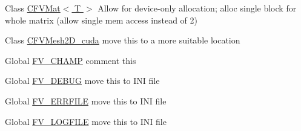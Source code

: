 \label{dd/da0/todo__todo000001}
\hypertarget{dd/da0/todo__todo000001}{}
 
\begin{DoxyDescription}
\item[Class \hyperlink{classFVL_1_1CFVMat}{CFVMat$<$ T $>$} ]Allow for device-\/only allocation; alloc single block for whole matrix (allow single mem access instead of 2) 
\end{DoxyDescription}

\label{dd/da0/todo__todo000002}
\hypertarget{dd/da0/todo__todo000002}{}
 
\begin{DoxyDescription}
\item[Class \hyperlink{structFVL_1_1CFVMesh2D__cuda}{CFVMesh2D\_\-cuda} ]move this to a more suitable location 
\end{DoxyDescription}

\label{dd/da0/todo__todo000006}
\hypertarget{dd/da0/todo__todo000006}{}
 
\begin{DoxyDescription}
\item[Global \hyperlink{FVMacros_8h_a8142e87b22064c193f2a21692cbc8e32}{FV\_\-CHAMP} ]comment this 
\end{DoxyDescription}

\label{dd/da0/todo__todo000011}
\hypertarget{dd/da0/todo__todo000011}{}
 
\begin{DoxyDescription}
\item[Global \hyperlink{FVMacros_8h_a18ca513bbb6063a08c200a208f14c2fa}{FV\_\-DEBUG} ]move this to INI file 
\end{DoxyDescription}

\label{dd/da0/todo__todo000009}
\hypertarget{dd/da0/todo__todo000009}{}
 
\begin{DoxyDescription}
\item[Global \hyperlink{FVMacros_8h_a4cb6bbc2c16d7fc7d1fb914ac4a4c8b0}{FV\_\-ERRFILE} ]move this to INI file 
\end{DoxyDescription}

\label{dd/da0/todo__todo000008}
\hypertarget{dd/da0/todo__todo000008}{}
 
\begin{DoxyDescription}
\item[Global \hyperlink{FVMacros_8h_a7b6bb00af6750cecdb196c9a8908d759}{FV\_\-LOGFILE} ]move this to INI file 
\end{DoxyDescription}


